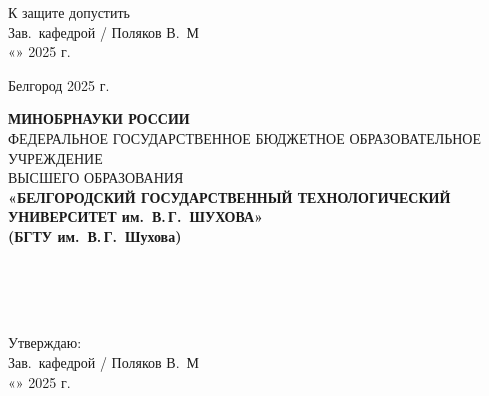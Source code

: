 \begin{center}
\begin{minipage}{11cm}
  К защите допустить\\[1em]
  Зав.\ кафедрой \underline{\hspace{4cm}} / Поляков В.\ М\\[1em]
  «\underline{\hspace{1cm}}» \underline{\hspace{4cm}} 2025 г.
\end{minipage}
\end{center}

\vfill
\begin{center}
  Белгород 2025 г.
\end{center}

\newpage
{}

\begin{center}
  \textbf{МИНОБРНАУКИ РОССИИ}\\[0.5em]
  \vspace{0.2em}
  {\scriptsize ФЕДЕРАЛЬНОЕ ГОСУДАРСТВЕННОЕ БЮДЖЕТНОЕ ОБРАЗОВАТЕЛЬНОЕ УЧРЕЖДЕНИЕ\\[-0.5em]
  ВЫСШЕГО ОБРАЗОВАНИЯ}\\[0.5em]
  {\small \textbf{«БЕЛГОРОДСКИЙ ГОСУДАРСТВЕННЫЙ ТЕХНОЛОГИЧЕСКИЙ\\
  УНИВЕРСИТЕТ им.\ В.\,Г.\ ШУХОВА»\\[-0.3em]
  (БГТУ им.\ В.\,Г.\ Шухова)}}
\end{center}

\vspace{1em}

\begin{flushleft}
{\footnotesize
  \\
  \\
  \\
}
\end{flushleft}

\begin{flushright}
\begin{minipage}{8.5cm}
\scriptsize
Утверждаю:\\
Зав.\ кафедрой \underline{\hspace{4cm}} / Поляков В.\ М\\[0.5em]
«\underline{\hspace{1cm}}» \underline{\hspace{4cm}} 2025 г.
\end{minipage}
\end{flushright}

